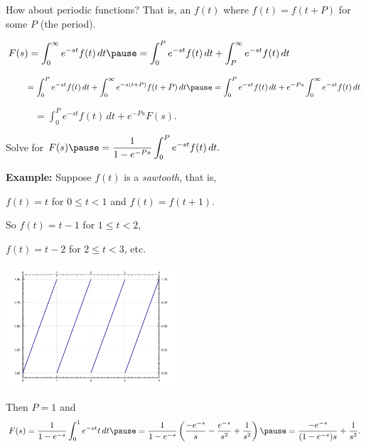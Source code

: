 \documentclass[10pt,aspectratio=169]{beamer}
\begin{document}
\begin{frame}
How about periodic functions?  That is, an $f(t)$ where $f(t) = f(t+P)$ for some $P$ (the period).

\pause
\medskip

$\displaystyle
F(s)
= \int_0^\infty e^{-st} f(t) \, dt
\pause
= \int_0^P e^{-st} f(t) \, dt
+ \int_P^\infty e^{-st} f(t) \, dt
$

\pause
\medskip

$\displaystyle
\phantom{F(s)}{} = \int_0^P e^{-st} f(t) \, dt
+ \int_0^\infty e^{-s(t+P)} f(t+P) \, dt
\pause
= \int_0^P e^{-st} f(t) \, dt
+ e^{-Ps} \int_0^\infty e^{-st} f(t) \, dt
$

\medskip
\pause

$\displaystyle
\phantom{F(s)}{} = \int_0^P e^{-st} f(t) \, dt
+ e^{-Ps} F(s)$.

\pause
Solve for $\displaystyle F(s)
\pause
=
\frac{1}{1-e^{-Ps}}
\int_0^P e^{-st} f(t) \, dt .
$

\medskip
\pause

\textbf{Example:}
Suppose $f(t)$ is a \emph{sawtooth}, that is,

$f(t) = t$ for $0 \leq t < 1$
and $f(t)=f(t+1)$.

\pause
So
$f(t) = t-1$ for $1 \leq t < 2$, 

$f(t) = t-2$ for $2 \leq t < 3$, etc.

\vspace*{-1.5in}
\hfill
\includegraphics[width=2.5in]{figures/sawtoothfig}

\vspace*{-0.25in}

\pause
Then $P=1$ and
\[
F(s) =
\frac{1}{1-e^{-s}}
\int_0^1 e^{-st} t \, dt 
\pause
=
\frac{1}{1-e^{-s}}
\left(
\frac{-e^{-s}}{s}-\frac{e^{-s}}{s^2} + \frac{1}{s^2}
\right)
\pause
=
\frac{-e^{-s}}{(1-e^{-s})s} + \frac{1}{s^2} .
\]
\end{frame}
\end{document}

